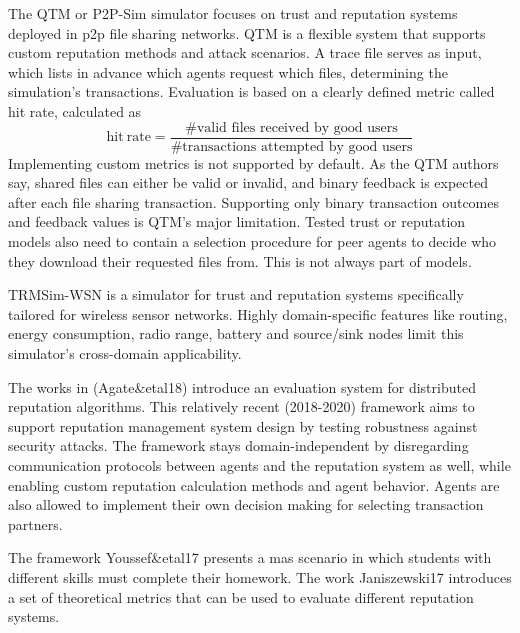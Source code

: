 \documentclass[%
    ]{\PathToTumTemplate/thesis/tum_thesis}
\begin{document}
The QTM or P2P-Sim simulator focuses on trust and reputation systems deployed in \gls{p2p} file sharing networks.
QTM is a flexible system that supports custom reputation methods and attack scenarios.
A trace file serves as input, which lists in advance which agents request which files, determining the simulation's transactions.
Evaluation is based on a clearly defined metric called hit rate, calculated as
\begin{equation}
\mathrm{hit~rate}=\frac{\text{\# valid files received by good users}}{\text{\# transactions attempted by good users}}
\end{equation}
Implementing custom metrics is not supported by default.
As the QTM authors say, shared files can either be valid or invalid, and binary feedback is expected after each file sharing transaction.
Supporting only binary transaction outcomes and feedback values is QTM's major limitation.
Tested trust or reputation models also need to contain a selection procedure for peer agents to decide who they download their requested files from.
This is not always part of models.

TRMSim-WSN is a simulator for trust and reputation systems specifically tailored for wireless sensor networks\cite{marmol_trmsim-wsn_2009}.
Highly domain-specific features like routing, energy consumption, radio range, battery and source/sink nodes limit this simulator's cross-domain applicability.

The works in \cite{agate_platform_2018,agate_reputation_2020} (Agate\&etal18) introduce an evaluation system for distributed reputation algorithms.
This relatively recent (2018-2020) framework aims to support reputation management system design by testing robustness against security attacks.
The framework stays domain-independent by disregarding communication protocols between agents and the reputation system as well, while enabling custom reputation calculation methods and agent behavior.
Agents are also allowed to implement their own decision making for selecting transaction partners.

The framework Youssef\&etal17 presents a \gls{mas} scenario in which students with different skills must complete their homework\cite{youssef_towards_2017}.
The work Janiszewski17 introduces a set of theoretical metrics that can be used to evaluate different reputation systems\cite{janiszewski_towards_2017}.



\end{document}
